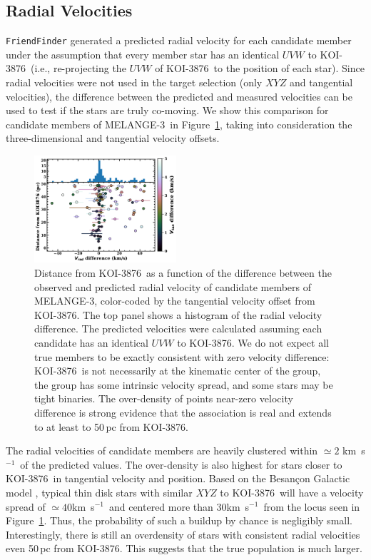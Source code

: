 \documentclass[twocolumn, linenumbers]{aastex631}
\newcommand{\association}{MELANGE-3}
\newcommand{\starname}{KOI-3876}
\newcommand\kms{km~s$^{-1}$}
\begin{document}
\subsection{Radial Velocities}\label{sec:RVs}

\texttt{FriendFinder} generated a predicted radial velocity for each candidate member under the assumption that every member star has an identical $UVW$ to \starname\ (i.e., re-projecting the $UVW$ of \starname\ to the position of each star). Since radial velocities were not used in the target selection (only $XYZ$ and tangential velocities), the difference between the predicted and measured velocities can be used to test if the stars are truly co-moving. We show this comparison for candidate members of \association\ in Figure~\ref{fig:groupRV}, taking into consideration the three-dimensional and tangential velocity offsets. 

\begin{figure}[tbp]
    \centering
    \includegraphics[width=0.47\textwidth]{Velocities.pdf}
    \caption{Distance from \starname\ as a function of the difference between the observed and predicted radial velocity of candidate members of \association, color-coded by the tangential velocity offset from \starname. The top panel shows a histogram of the radial velocity difference. The predicted velocities were calculated assuming each candidate has an identical $UVW$ to \starname. We do not expect all true members to be exactly consistent with zero velocity difference: \starname\ is not necessarily at the kinematic center of the group, the group has some intrinsic velocity spread, and some stars may be tight binaries. The over-density of points near-zero velocity difference is strong evidence that the association is real and extends to at least to 50\,pc from \starname. 
    \label{fig:groupRV}
    }
\end{figure} 

The radial velocities of candidate members are heavily clustered within $\simeq2$ \kms\ of the predicted values. The over-density is also highest for stars closer to \starname\ in tangential velocity and position. Based on the Besan\c con Galactic model \citep{2014A&A...564A.102C}, typical thin disk stars with similar $XYZ$ to \starname\ will have a velocity spread of $\simeq40$\kms\ and centered more than 30\kms\ from the locus seen in Figure~\ref{fig:groupRV}. Thus, the probability of such a buildup by chance is negligibly small. Interestingly, there is still an overdensity of stars with consistent radial velocities even 50\,pc from \starname. This suggests that the true population is much larger.
\end{document}
